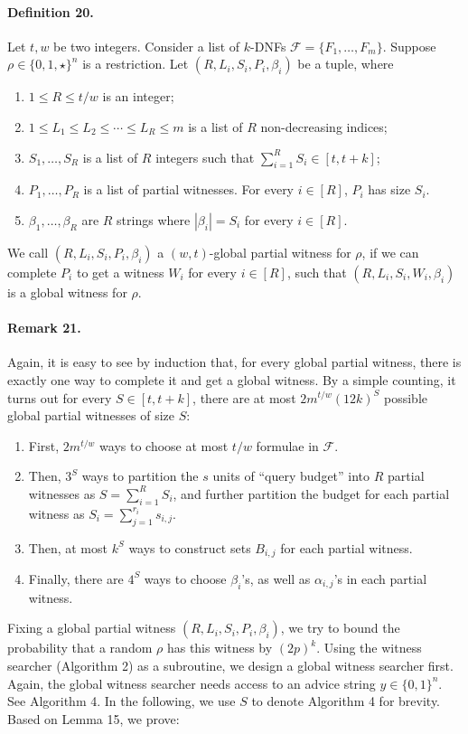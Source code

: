 \documentclass[10pt,a4paper]{article}
\begin{document}
\paragraph{Definition 20.} Let $t,w$ be two integers. Consider a list of $k$-DNFs $\mathcal F=\{F_1,\ldots,F_m\}$. Suppose $\rho\in\{0,1,\star\}^n$ is a restriction. Let $(R,L_i,S_i,P_i,\beta_i)$ be a tuple, where
\begin{enumerate}\item $1\le R\le t/w$ is an integer;
\item $1\le L_1\le L_2\le\cdots\le L_R\le m$ is a list of $R$ non-decreasing indices;
\item $S_1,\ldots,S_R$ is a list of $R$ integers such that $\sum_{i=1}^RS_i\in[t,t+k]$;
\item $P_1,\ldots,P_R$ is a list of partial witnesses. For every $i\in[R]$, $P_i$ has size $S_i$.
\item $\beta_1,\ldots,\beta_R$ are $R$ strings where $|\beta_i|=S_i$ for every $i\in[R]$.\end{enumerate}
We call $(R,L_i,S_i,P_i,\beta_i)$ a $(w,t)$-global partial witness for $\rho$, if we can complete $P_i$ to get a witness $W_i$ for every $i\in[R]$, such that $(R,L_i,S_i,W_i,\beta_i)$ is a global witness for $\rho$.
\paragraph{Remark 21.} Again, it is easy to see by induction that, for every global partial witness, there is exactly one way to complete it and get a global witness. By a simple counting, it turns out for every $S\in[t,t+k]$, there are at most $2m^{t/w}(12k)^S$ possible global partial witnesses of size $S$:
\begin{enumerate}\item First, $2m^{t/w}$ ways to choose at most $t/w$ formulae in $\mathcal F$.
\item Then, $3^S$ ways to partition the $s$ units of ``query budget'' into $R$ partial witnesses as $S=\sum_{i=1}^RS_i$, and further partition the budget for each partial witness as $S_i=\sum_{j=1}^{r_i}s_{i,j}$.
\item Then, at most $k^S$ ways to construct sets $B_{i,j}$ for each partial witness.
\item Finally, there are $4^S$ ways to choose $\beta_i$'s, as well as $\alpha_{i,j}$'s in each partial witness.\end{enumerate}
Fixing a global partial witness $(R,L_i,S_i,P_i,\beta_i)$, we try to bound the probability that a random $\rho$ has this witness by $(2p)^k$. Using the witness searcher (Algorithm 2) as a subroutine, we design a global witness searcher first. Again, the global witness searcher needs access to an advice string $y\in\{0,1\}^n$. See Algorithm 4. In the following, we use $S$ to denote Algorithm 4 for brevity. Based on Lemma 15, we prove:
\end{document}
